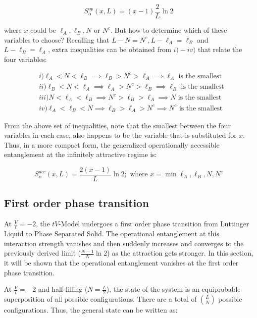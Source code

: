 \begin{equation}
S_\alpha^{op}(x,L) = (x - 1) \frac{2}{L} \ln{2}
\end{equation}

where $x$ could be  $\ell_A, \ell_B, N$ or $N^c$. But how to determine which of these variables to choose? Recalling that $L-N = N^c, L-\ell_A = \ell_B$ and $L-\ell_B = \ell_A$, extra inequalities can be obtained from $i)-iv)$ that relate the four variables:

\begin{align}
& i) \ell_{A} < N < \ell_{B} \implies \ell_{B} > N^c > \ell_{A} \implies \ell_{A} \text{ is the smallest} \nonumber \\
& ii) \ell_{B} < N < \ell_{A} \implies \ell_{A} > N^c > \ell_{B} \implies \ell_{B} \text{ is the smallest} \nonumber \\
& iii)  N < \ell_{A} < \ell_{B} \implies N^c > \ell_{B} > \ell_{A} \implies N \text{ is the smallest} \nonumber \\
& iv) \ell_{A} < \ell_{B} < N \implies \ell_{B} > \ell_{A} > N^c \implies N^c \text{ is the smallest} \nonumber 
\end{align}

From the above set of inequalities, note that the smallest between the four variables in each case, also happens to be the variable that is substituted for $x$. Thus, in a more compact form, the generalized operationally accessible entanglement at the infinitely attractive regime is:

\begin{equation}
S_\alpha^{acc}(x,L) = \frac{2(x-1)}{L} \ln{2} ; \text{ where } x = \min{\ell_A, \ell_B, N, N^c}
\end{equation}

	\subsection{First order phase transition}
	
At $\frac{V}{t} = -2$, the $tV$-Model undergoes a first order phase transition from Luttinger Liquid to Phase Separated Solid. The operational entanglement at this interaction strength vanishes and then suddenly increases and converges to the previously derived limit ($\frac{N-1}{N}\ln{2}$) as the attraction gets stronger. In this section, it will be shown that the operational entanglement vanishes at the first order phase transition.

At $\frac{V}{t}=-2$ and half-filling ($N=\frac{L}{2}$), the state of the system is an equiprobable superposition of all possible configurations. There are a total of ${L}\choose{N}$ possible configurations. Thus, the general state can be written as: 


